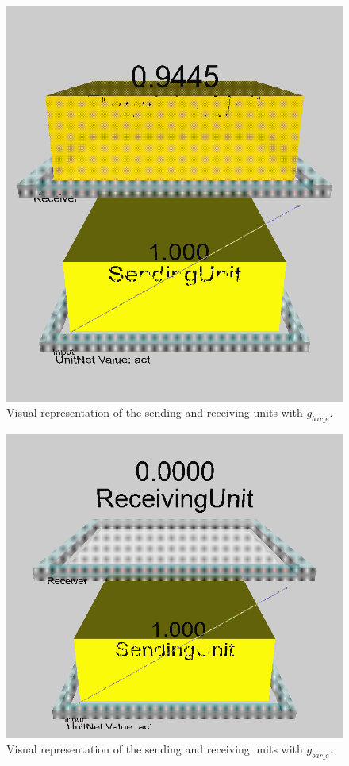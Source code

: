 \begin{multicols}{2}
\begin{figure}[H]
\centering
\includegraphics[scale=0.225]{Media/Main/EQ1/2.1.Aa.png}
\caption{Visual representation of the sending and receiving units with $g_{bar\_e}$.}
\label{Q2.1 - 0.5}
\end{figure}

\begin{figure}[H]
\centering
\includegraphics[scale=0.225]{Media/Main/EQ1/2.1.Ab.png}
\caption{Visual representation of the sending and receiving units with $g_{bar\_e}$.}
\label{Q2.1 - 0.3}
\end{figure}


\end{multicols}
